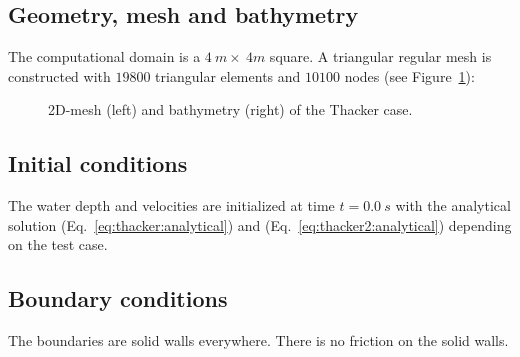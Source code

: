 \subsection{Geometry, mesh and bathymetry}

The computational domain is a $4~m \times~4m$ square.
A triangular regular mesh is constructed with $19800$ triangular elements and 
$10100$ nodes (see Figure~\ref{fig:thacker:Mesh}):

\begin{figure}[H]
\begin{minipage}[t]{0.45\textwidth}
 \centering
\end{minipage}%
\begin{minipage}[t]{0.55\textwidth}
 \centering
\end{minipage}
  \caption{2D-mesh (left) and bathymetry (right) of the Thacker case.}\label{fig:thacker:Mesh}
\end{figure}

%

\subsection{Initial conditions}

The water depth and velocities are initialized  at time $t=0.0~s$ with the analytical solution (Eq.~\ref{eq:thacker:analytical}) and  (Eq.~\ref{eq:thacker2:analytical}) depending on the test case.

\subsection{Boundary conditions}

The boundaries are solid walls everywhere. There is no friction on the solid walls.

